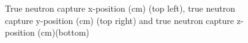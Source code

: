 \begin{figure}
\centering
    \begin{minipage}{0.5\linewidth}
    \end{minipage}%
    \begin{minipage}{0.5\linewidth}
    \centering
    \end{minipage}\par\medskip
    \centering
    
    \caption{True neutron capture x-position (cm) (top left), true neutron capture y-position (cm) (top right) and true neutron capture z-position (cm)(bottom) }
    \label{fig:TrueNCapPos}
\end{figure}


